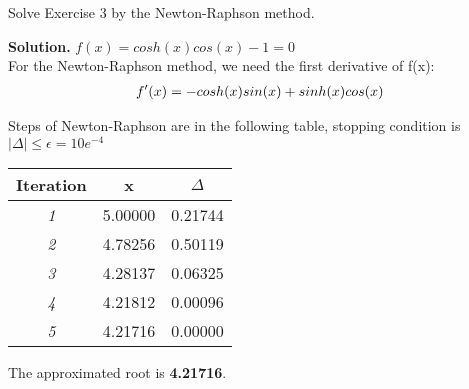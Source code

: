 \begin{exercise}{4} %
Solve Exercise 3 by the Newton-Raphson method.

\textbf{Solution.} 
$f(x) = cosh(x)cos(x)-1=0$ \\

For the Newton-Raphson method, we need the first derivative of f(x):
\begin{align}
f^\prime(x) = -cosh(x)sin(x) + sinh(x)cos(x) \notag
\end{align}

Steps of Newton-Raphson are in the following table, stopping condition is $|\Delta| \leq \epsilon = 10e^{-4}$ 

\begin{table}[H]
\centering
\begin{tabular}{|c|r|r|}
\hline
\textbf{Iteration} & \multicolumn{1}{c|}{\textbf{x}} & \multicolumn{1}{c|}{\textbf{\(\Delta\)}} \\ \hline
\textit{1} & 5.00000 & 0.21744 \\ \hline
\textit{2} & 4.78256 & 0.50119 \\ \hline
\textit{3} & 4.28137 & 0.06325 \\ \hline
\textit{4} & 4.21812 & 0.00096 \\ \hline
\textit{5} & 4.21716 & 0.00000 \\ \hline
\end{tabular}
\end{table}

The approximated root is  \textbf{4.21716}.
\end{exercise}

